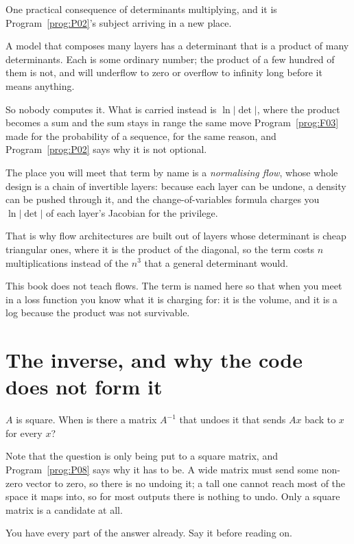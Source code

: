 \begin{fr}
One practical consequence of determinants multiplying, and it is
Program~\ref{prog:P02}'s subject arriving in a new place.

A model that composes many layers has a determinant that is a product of many
determinants. Each is some ordinary number; the product of a few hundred of
them is not, and will underflow to zero or overflow to infinity long before it
means anything.

So nobody computes it. What is carried instead is $\ln \lvert \det \rvert$,
where the product becomes a sum and the sum stays in range \dash{} the same
move Program~\ref{prog:F03} made for the probability of a sequence, for the
same reason, and Program~\ref{prog:P02} says why it is not optional.
\end{fr}

\begin{aibox}
The place you will meet that term by name is a \emph{normalising flow}, whose
whole design is a chain of invertible layers: because each layer can be undone,
a density can be pushed through it, and the change-of-variables formula charges
you $\ln \lvert \det \rvert$ of each layer's Jacobian for the privilege.

That is why flow architectures are built out of layers whose determinant is
cheap \dash{} triangular ones, where it is the product of the diagonal, so the
term costs $n$ multiplications instead of the $n^{3}$ that a general
determinant would.

This book does not teach flows. The term is named here so that when you meet
 in a loss function you know what it is charging for: it is the
volume, and it is a log because the product was not survivable.
\end{aibox}

\section{The inverse, and why the code does not form it}
\label{sec:P09-inverse}

\begin{fr}
$A$ is square. When is there a matrix $A^{-1}$ that undoes it \dash{} that
sends $Ax$ back to $x$ for every $x$?

Note that the question is only being put to a square matrix, and
Program~\ref{prog:P08} says why it has to be. A wide matrix must send some
non-zero vector to zero, so there is no undoing it; a tall one cannot reach
most of the space it maps into, so for most outputs there is nothing to undo.
Only a square matrix is a candidate at all.

You have every part of the answer already. Say it before reading on.
\dotline
\nextframe
\end{fr}

